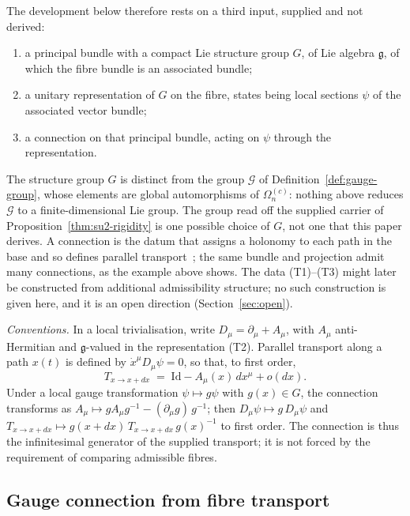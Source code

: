 \documentclass[11pt,a4paper]{article}
\begin{document}
    The development below therefore rests on a third input, supplied and not derived:
    \begin{enumerate}[(T1)]
      \item a principal bundle with a compact Lie structure group $G$, of Lie algebra $\mathfrak{g}$,
      of which the fibre bundle is an associated bundle;
      \item a unitary representation of $G$ on the fibre, states being local sections $\psi$ of the
      associated vector bundle;
      \item a connection on that principal bundle, acting on $\psi$ through the representation.
    \end{enumerate}
    The structure group $G$ is distinct from the group $\mathcal{G}$ of
    Definition~\ref{def:gauge-group}, whose elements are global automorphisms of
    $\Omega_n^{(c)}$: nothing above reduces $\mathcal{G}$ to a finite-dimensional Lie group.
    The group read off the supplied carrier of Proposition~\ref{thm:su2-rigidity} is one possible
    choice of $G$, not one that this paper derives.
    A connection is the datum that assigns a holonomy to each path in the base and so defines
    parallel transport~\cite{BaezSchreiber2007}; the same bundle and projection admit many
    connections, as the example above shows.
    The data (T1)--(T3) might later be constructed from additional admissibility structure; no such
    construction is given here, and it is an open direction (Section~\ref{sec:open}).

    \emph{Conventions.}
    In a local trivialisation, write $D_\mu = \partial_\mu + A_\mu$, with $A_\mu$ anti-Hermitian
    and $\mathfrak{g}$-valued in the representation (T2).
    Parallel transport along a path $x(t)$ is defined by $\dot{x}^\mu D_\mu \psi = 0$, so that, to first
    order,
    \begin{equation}
      \label{eq:transport-expansion}
      T_{x \to x+dx}
      \;=\; \mathrm{Id} - A_\mu(x)\,dx^\mu + o(dx).
    \end{equation}
    Under a local gauge transformation $\psi \mapsto g\psi$ with $g(x) \in G$, the connection
    transforms as $A_\mu \mapsto g A_\mu g^{-1} - (\partial_\mu g)\,g^{-1}$; then
    $D_\mu\psi \mapsto g\,D_\mu\psi$ and $T_{x \to x+dx} \mapsto g(x+dx)\,T_{x \to x+dx}\,g(x)^{-1}$
    to first order.
    The connection is thus the infinitesimal generator of the supplied transport; it is not forced by
    the requirement of comparing admissible fibres.

  \subsection{Gauge connection from fibre transport}
\end{document}
